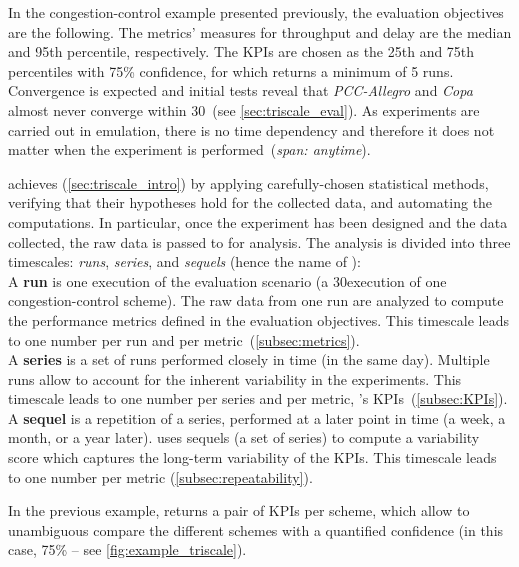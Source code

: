 In the congestion-control example presented previously, the evaluation objectives are the following.
The metrics' measures for throughput and delay are the median and 95th percentile, respectively.
The KPIs are chosen as the 25th and 75th percentiles with 75\% confidence, for which \triscale returns a minimum of 5 runs.
Convergence is expected and initial tests reveal that \textit{PCC-Allegro} and \textit{Copa} almost never converge within 30\s~(see \cref{sec:triscale_eval}).
As experiments are carried out in emulation, there is no time dependency and therefore it does not matter when the experiment is performed~(\ie \emph{span: anytime}).


\triscale achieves  (\cref{sec:triscale_intro}) by
applying carefully-chosen statistical methods, verifying that their hypotheses hold for the collected data, and automating the computations.
In particular, once the experiment has been designed and the data collected, the raw data is passed to \triscale for analysis.
The analysis is divided into three timescales: \emph{runs}, \emph{series}, and \emph{sequels} (hence the name of \triscale):\\
%
%
  A \textbf{run} is one execution of the evaluation scenario (\eg a 30\s execution of one congestion-control scheme).
  The raw data from one run are analyzed to compute the performance metrics defined in the evaluation objectives.
  This timescale leads to one number per run and per metric~(\cref{subsec:metrics}).\\
  A \textbf{series} is a set of runs performed closely in time (\eg in the same day).
  Multiple runs allow to account for the inherent variability in the experiments.
  This timescale leads to one number per series and per metric, \ie \triscale's KPIs~(\cref{subsec:KPIs}).\\
  A \textbf{sequel} is a repetition of a series, performed at a later point in time (\eg a week, a month, or a year later).
  \triscale uses sequels (\ie a set of series) to compute a variability score which captures the long-term variability of the KPIs.
  This timescale leads to one number per metric (\cref{subsec:repeatability}).
%

In the previous example, \triscale returns a pair of KPIs per scheme, which allow to unambiguous compare the different schemes with a quantified confidence (in this case, 75\% -- see \cref{fig:example_triscale}).
